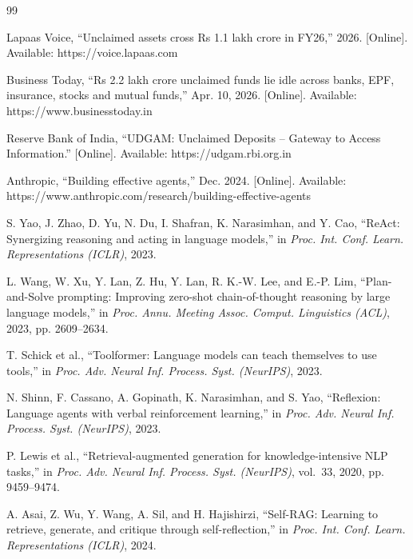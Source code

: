 \documentclass[12pt,a4paper,oneside]{report}
\begin{document}
\begin{thebibliography}{99}

 Lapaas Voice, ``Unclaimed assets cross Rs 1.1 lakh crore in FY26,'' 2026. [Online]. Available: https://voice.lapaas.com

 Business Today, ``Rs 2.2 lakh crore unclaimed funds lie idle across banks, EPF, insurance, stocks and mutual funds,'' Apr. 10, 2026. [Online]. Available: https://www.businesstoday.in

 Reserve Bank of India, ``UDGAM: Unclaimed Deposits -- Gateway to Access Information.'' [Online]. Available: https://udgam.rbi.org.in

 Anthropic, ``Building effective agents,'' Dec. 2024. [Online]. Available: https://www.anthropic.com/research/building-effective-agents

 S. Yao, J. Zhao, D. Yu, N. Du, I. Shafran, K. Narasimhan, and Y. Cao, ``ReAct: Synergizing reasoning and acting in language models,'' in \emph{Proc. Int. Conf. Learn. Representations (ICLR)}, 2023.

 L. Wang, W. Xu, Y. Lan, Z. Hu, Y. Lan, R. K.-W. Lee, and E.-P. Lim, ``Plan-and-Solve prompting: Improving zero-shot chain-of-thought reasoning by large language models,'' in \emph{Proc. Annu. Meeting Assoc. Comput. Linguistics (ACL)}, 2023, pp. 2609--2634.

 T. Schick et al., ``Toolformer: Language models can teach themselves to use tools,'' in \emph{Proc. Adv. Neural Inf. Process. Syst. (NeurIPS)}, 2023.

 N. Shinn, F. Cassano, A. Gopinath, K. Narasimhan, and S. Yao, ``Reflexion: Language agents with verbal reinforcement learning,'' in \emph{Proc. Adv. Neural Inf. Process. Syst. (NeurIPS)}, 2023.

 P. Lewis et al., ``Retrieval-augmented generation for knowledge-intensive NLP tasks,'' in \emph{Proc. Adv. Neural Inf. Process. Syst. (NeurIPS)}, vol.~33, 2020, pp. 9459--9474.

 A. Asai, Z. Wu, Y. Wang, A. Sil, and H. Hajishirzi, ``Self-RAG: Learning to retrieve, generate, and critique through self-reflection,'' in \emph{Proc. Int. Conf. Learn. Representations (ICLR)}, 2024.


\end{thebibliography}
\end{document}
